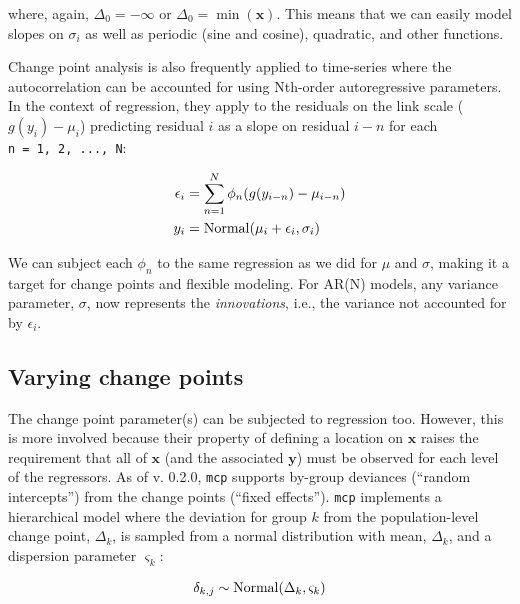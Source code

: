 \documentclass[
  american,
]{article}
\begin{document}
where, again, \(\Delta_0 = -\infty\) or \(\Delta_0 = \min(\mathbf{x})\). This means that we can easily model slopes on \(\sigma_i\) as well as periodic (sine and cosine), quadratic, and other functions.

Change point analysis is also frequently applied to time-series where the autocorrelation can be accounted for using Nth-order autoregressive parameters. In the context of regression, they apply to the residuals on the link scale (\(g(y_i) - \mu_i\)) predicting residual \(i\) as a slope on residual \(i-n\) for each \texttt{n\ =\ 1,\ 2,\ ...,\ N}:

\begin{equation}
\begin{aligned}
  \epsilon_i & = \sum_{n=1}^{N} \phi_n(g(y_{i-n}) - \mu_{i-n}) \\
  y_i & = {\rm Normal}(\mu_i + \epsilon_i, \sigma_i)
\end{aligned}
\end{equation}

We can subject each \(\phi_n\) to the same regression as we did for \(\mu\) and \(\sigma\), making it a target for change points and flexible modeling. For AR(N) models, any variance parameter, \(\sigma\), now represents the \emph{innovations}, i.e., the variance not accounted for by \(\epsilon_i\).

\hypertarget{varying-change-points}{%
\subsection{Varying change points}\label{varying-change-points}}

The change point parameter(s) can be subjected to regression too. However, this is more involved because their property of defining a location on \(\mathbf{x}\) raises the requirement that all of \(\mathbf{x}\) (and the associated \(\mathbf{y}\)) must be observed for each level of the regressors. As of v. 0.2.0, \texttt{mcp} supports by-group deviances (``random intercepts'') from the change points (``fixed effects''). \texttt{mcp} implements a hierarchical model where the deviation for group \(k\) from the population-level change point, \(\Delta_k\), is sampled from a normal distribution with mean, \(\Delta_k\), and a dispersion parameter \(\varsigma_k\):

\begin{equation}
\delta_{k, j} \sim {\rm Normal}(\Delta_k, \varsigma_k)
\end{equation}
\end{document}
